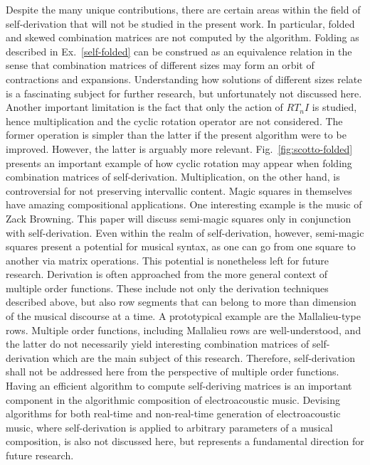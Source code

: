 Despite the many unique contributions, there are certain areas within the field of self-derivation that will not be studied in the present work. In particular, folded and skewed combination matrices are not computed by the algorithm. Folding as described in Ex.~\ref{self-folded} can be construed as an equivalence relation in the sense that combination matrices of different sizes may form an orbit of contractions and expansions. Understanding how solutions of different sizes relate is a fascinating subject for further research, but unfortunately not discussed here. Another important limitation is the fact that only the action of $RT_nI$ is studied, hence multiplication and the cyclic rotation operator are not considered. The former operation is simpler than the latter if the present algorithm were to be improved. However, the latter is arguably more relevant. Fig.~\ref{fig:scotto-folded} presents an important example of how cyclic rotation may appear when folding combination matrices of self-derivation. Multiplication, on the other hand, is controversial for not preserving intervallic content. Magic squares in themselves have amazing compositional applications. One interesting example is the music of Zack Browning. This paper will discuss semi-magic squares only in conjunction with self-derivation. Even within the realm of self-derivation, however, semi-magic squares present a potential for musical syntax, as one can go from one square to another via matrix operations. This potential is nonetheless left for future research. Derivation is often approached from the more general context of multiple order functions. These include not only the derivation techniques described above, but also row segments that can belong to more than dimension of the musical discourse at a time. A prototypical example are the Mallalieu-type rows. Multiple order functions, including Mallalieu rows are well-understood, and the latter do not necessarily yield interesting combination matrices of self-derivation which are the main subject of this research. Therefore, self-derivation shall not be addressed here from the perspective of multiple order functions. Having an efficient algorithm to compute self-deriving matrices is an important component in the algorithmic composition of electroacoustic music. Devising algorithms for both real-time and non-real-time generation of electroacoustic music, where self-derivation is applied to arbitrary parameters of a musical composition, is also not discussed here, but represents a fundamental direction for future research.

